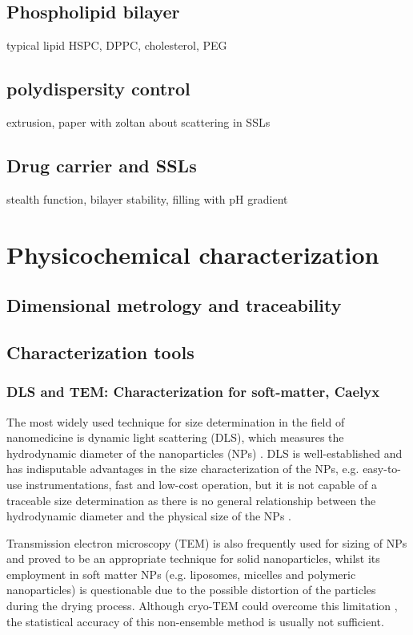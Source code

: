 \subsection{Phospholipid bilayer}
typical lipid HSPC, DPPC, cholesterol, PEG

\subsection{polydispersity control}
extrusion, paper with zoltan about scattering in SSLs

\subsection{Drug carrier and SSLs}
stealth function, bilayer stability, filling with pH gradient

\section{Physicochemical characterization}
\subsection{Dimensional metrology and traceability}

\subsection{Characterization tools}

\subsubsection{DLS and TEM: Characterization for soft-matter, Caelyx}
The most widely used technique for size determination in the field of nanomedicine is dynamic light scattering (DLS), which measures the hydrodynamic diameter of the nanoparticles (NPs) \citep{murphy_static_1997, hallett_vesicle_1991, egelhaaf_determination_1996, takahashi_precise_2008, jans_dynamic_2009, hoo_comparison_2008}. DLS is well-established and has indisputable advantages in the size characterization of the NPs, e.g. easy-to-use instrumentations, fast and low-cost operation, but it is not capable of a traceable size determination as there is no general relationship between the hydrodynamic diameter and the physical size of the NPs \citep{meli_traceable_2012}. 

Transmission electron microscopy (TEM) is also frequently used for sizing of NPs and proved to be an appropriate technique for solid nanoparticles, whilst its employment in soft matter NPs (e.g. liposomes, micelles and polymeric nanoparticles) is questionable due to the possible distortion of the particles during the drying process.  Although cryo-TEM could overcome this limitation \citep{li_doxorubicin_1998}, the statistical accuracy of this non-ensemble method is usually not sufficient.



